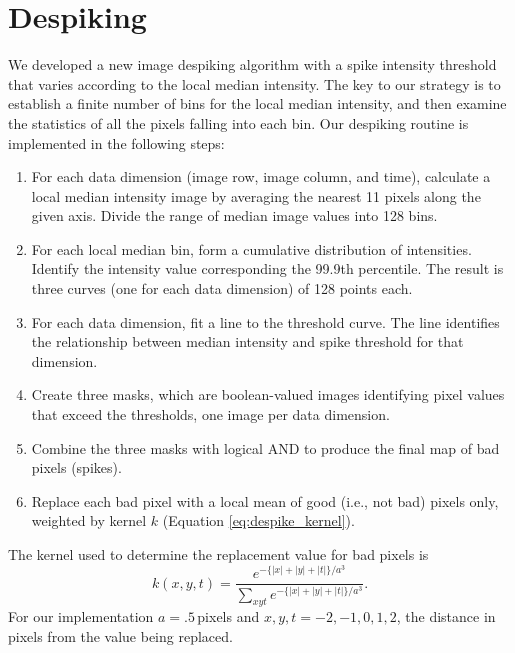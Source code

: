 \section{Despiking}\label{despike}
    We developed a new image despiking algorithm with a spike intensity threshold that varies according to the local median intensity. The key to our strategy is to establish a finite number of bins for the local median intensity, and then examine the statistics of all the pixels falling into each bin. Our despiking routine is implemented in the following steps:
\begin{enumerate}
    \item For each data dimension (image row, image column, and time), calculate a local median intensity image by averaging the nearest 11 pixels along the given axis. Divide the range of median image values into 128 bins.
    \item For each local median bin, form a cumulative distribution of intensities. Identify the intensity value corresponding the 99.9th percentile. The result is three curves (one for each data dimension) of 128 points each. 
    \item For each data dimension, fit a line to the threshold curve. The line identifies the relationship between median intensity and spike threshold for that dimension.
    \item Create three masks, which are  boolean-valued images identifying pixel values that exceed the thresholds, one image per data dimension.
    \item Combine the three masks with logical AND to produce the final map of bad pixels (spikes). 
    \item Replace each bad pixel with a local mean of good (i.e., not bad) pixels only, weighted by kernel $k$ (Equation \ref{eq:despike_kernel}).
\end{enumerate}
The kernel used to determine the replacement value for bad pixels is
\begin{equation} \label{eq:despike_kernel}
    k(x,y,t) = \frac{e^{-\lbrace|x|+|y|+|t|\rbrace/a^3}}{\sum_{xyt} e^{-\lbrace|x|+|y|+|t|\rbrace/a^3}}.
\end{equation}
For our implementation $a=.5$\,pixels and $x,y,t= -2, -1, 0, 1 , 2$, the distance in pixels from the value being replaced.  

